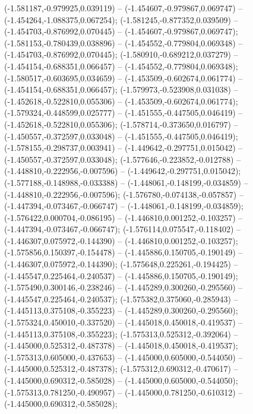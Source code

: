  (-1.581187,-0.979925,0.039119) -- (-1.454607,-0.979867,0.069747) -- (-1.454264,-1.088375,0.067254);
 (-1.581245,-0.877352,0.039509) -- (-1.454703,-0.876992,0.070445) -- (-1.454607,-0.979867,0.069747);
 (-1.581153,-0.780439,0.038896) -- (-1.454552,-0.779804,0.069348) -- (-1.454703,-0.876992,0.070445);
 (-1.580910,-0.689212,0.037279) -- (-1.454154,-0.688351,0.066457) -- (-1.454552,-0.779804,0.069348);
 (-1.580517,-0.603695,0.034659) -- (-1.453509,-0.602674,0.061774) -- (-1.454154,-0.688351,0.066457);
 (-1.579973,-0.523908,0.031038) -- (-1.452618,-0.522810,0.055306) -- (-1.453509,-0.602674,0.061774);
 (-1.579324,-0.448599,0.025777) -- (-1.451555,-0.447505,0.046419) -- (-1.452618,-0.522810,0.055306);
 (-1.578714,-0.373650,0.016797) -- (-1.450557,-0.372597,0.033048) -- (-1.451555,-0.447505,0.046419);
 (-1.578155,-0.298737,0.003941) -- (-1.449642,-0.297751,0.015042) -- (-1.450557,-0.372597,0.033048);
 (-1.577646,-0.223852,-0.012788) -- (-1.448810,-0.222956,-0.007596) -- (-1.449642,-0.297751,0.015042);
 (-1.577188,-0.148988,-0.033388) -- (-1.448061,-0.148199,-0.034859) -- (-1.448810,-0.222956,-0.007596);
 (-1.576780,-0.074138,-0.057857) -- (-1.447394,-0.073467,-0.066747) -- (-1.448061,-0.148199,-0.034859);
 (-1.576422,0.000704,-0.086195) -- (-1.446810,0.001252,-0.103257) -- (-1.447394,-0.073467,-0.066747);
 (-1.576114,0.075547,-0.118402) -- (-1.446307,0.075972,-0.144390) -- (-1.446810,0.001252,-0.103257);
 (-1.575856,0.150397,-0.154478) -- (-1.445886,0.150705,-0.190149) -- (-1.446307,0.075972,-0.144390);
 (-1.575648,0.225261,-0.194425) -- (-1.445547,0.225464,-0.240537) -- (-1.445886,0.150705,-0.190149);
 (-1.575490,0.300146,-0.238246) -- (-1.445289,0.300260,-0.295560) -- (-1.445547,0.225464,-0.240537);
 (-1.575382,0.375060,-0.285943) -- (-1.445113,0.375108,-0.355223) -- (-1.445289,0.300260,-0.295560);
 (-1.575324,0.450010,-0.337520) -- (-1.445018,0.450018,-0.419537) -- (-1.445113,0.375108,-0.355223);
 (-1.575313,0.525312,-0.392064) -- (-1.445000,0.525312,-0.487378) -- (-1.445018,0.450018,-0.419537);
 (-1.575313,0.605000,-0.437653) -- (-1.445000,0.605000,-0.544050) -- (-1.445000,0.525312,-0.487378);
 (-1.575312,0.690312,-0.470617) -- (-1.445000,0.690312,-0.585028) -- (-1.445000,0.605000,-0.544050);
 (-1.575313,0.781250,-0.490957) -- (-1.445000,0.781250,-0.610312) -- (-1.445000,0.690312,-0.585028);

